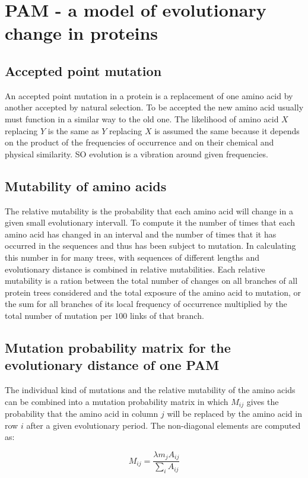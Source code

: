 \chapter{PAM - a model of evolutionary change in proteins}

\section{Accepted point mutation}
An accepted point mutation in a protein is a replacement of one amino acid by another accepted by natural selection.
To be accepted the new amino acid usually must function in a similar way to the old one.
The likelihood of amino acid $X$ replacing $Y$ is the same as $Y$ replacing $X$ is assumed the same because it depends on the product of the frequencies of occurrence and on their chemical and physical similarity.
SO evolution is a vibration around given frequencies.

\section{Mutability of amino acids}
The relative mutability is the probability that each amino acid will change in a given small evolutionary intervall.
To compute it the number of times that each amino acid has changed in an interval and the number of times that it has occurred in the sequences and thus has been subject to mutation.
In calculating this number in for many trees, with sequences of different lengths and evolutionary distance is combined in relative mutabilities.
Each relative mutability is a ration between the total number of changes on all branches of all protein trees considered and the total exposure of the amino acid to mutation, or the sum for all branches of its local frequency of occurrence multiplied by the total number of mutation per $100$ links of that branch.

\section{Mutation probability matrix for the evolutionary distance of one PAM}
The individual kind of mutations and the relative mutability of the amino acids can be combined into a mutation probability matrix in which $M_{ij}$ gives the probability that the amino acid in column $j$ will be replaced by the amino acid in row $i$ after a given evolutionary period.
The non-diagonal elements are computed as:

$$M_{ij} = \frac{\lambda m_jA_{ij}}{\sum\limits_iA_{ij}}$$

